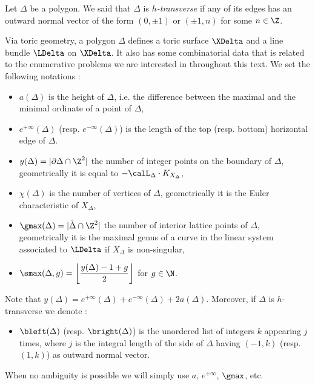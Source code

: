 \begin{defi} \label{def-htransverse}
Let $\Delta$ be a polygon. We said that $\Delta$ is \emph{$h$-transverse} if any of its edges has an outward normal vector of the form $(0,\pm 1)$ or $(\pm 1,n)$ for some $n\in\Z$.
\end{defi}


Via toric geometry, a polygon $\Delta$ defines a toric surface $\XDelta$ and a line bundle $\LDelta$ on $\XDelta$. 
It also has some combinatorial data that is related to the enumerative problems we are interested in throughout this text. We set the following notations :
\begin{itemize}
	\item $a(\Delta)$ is the height of $\Delta$, i.e.  the difference between the maximal and the minimal ordinate of a point of $\Delta$,
	
	\item $e^{+\infty}(\Delta)$ (resp. $e^{-\infty}(\Delta)$) is the length of the top (resp. bottom) horizontal edge of $\Delta$.
 
  	\item $y(\Delta) = |\partial \Delta \cap \Z^2|$ the number of integer points on the boundary of $\Delta$, geometrically it is equal to $- \calL_\Delta \cdot K_{X_\Delta}$, 

  	\item $\chi(\Delta)$ is the number of vertices of $\Delta$, geometrically it is the Euler characteristic of $X_\Delta$,

   \item $\gmax(\Delta) = |\mathring\Delta \cap\Z^2|$ the number of interior lattice points of $\Delta$, geometrically it is the maximal genus of a curve in the linear system associated to $\LDelta$ if $X_\Delta$ is non-singular,
  	
  	\item $\smax(\Delta,g) = \left\lfloor \dfrac{y(\Delta)-1+g}{2} \right \rfloor$ for $g\in\N$.
\end{itemize}
Note that $y(\Delta) = e^{+\infty}(\Delta) + e^{-\infty}(\Delta) + 2a(\Delta)$.
Moreover, if $\Delta$ is $h$-transverse we denote :
\begin{itemize}
	\item $\bleft(\Delta)$ (resp. $\bright(\Delta)$) is the unordered list of integers $k$ appearing $j$ times, where $j$ is the integral length of the side of $\Delta$ having $(-1,k)$ (resp. $(1,k)$) as outward normal vector. 
\end{itemize}
When no ambiguity is possible we will simply use $a$, $e^{+\infty}$, $\gmax$, etc.

